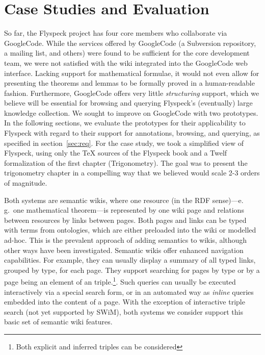 \section{Case Studies and Evaluation}

So far, the Flyspeck project has four core members who collaborate via
GoogleCode\cite{website:FlyspeckProjectPage}.  While the services offered by
GoogleCode (a Subversion repository, a mailing list, and others) were
found to be sufficient for the core development team, we were not
satisfied with the wiki integrated into the GoogleCode web interface.
Lacking support for mathematical formulae, it would not even allow for
presenting the theorems and lemmas to be formally proved in a
human-readable fashion.  Furthermore, GoogleCode offers very
little \emph{structuring} support, which we believe will be
essential for browsing and querying Flyspeck's 
(eventually) large knowledge collection.  We sought to improve
on GoogleCode with two prototypes.  
In the following sections, we evaluate the prototypes 
for their applicability to Flyspeck with regard to their
support for annotations, browsing, and querying, as specified in
section~\ref{sec:req}.  For the case study, we took a simplified 
view of Flyspeck, using only the {\TeX} sources of the
Flyspeck book and a Twelf formalization of the first chapter (Trigonometry).
The goal was to present the trigonometry chapter in a compelling way
that we believed would scale 2-3 orders of magnitude.  

Both systems are semantic wikis, where one resource (in the RDF
sense)---e.\,g.\ one mathematical theorem---is represented by one wiki
page and relations between resources by links between pages.  Both
pages and links can be typed with terms from
ontologies\cite{OrDeMoVoHa06:annotation-navigation-semwiki}, which are
either preloaded into the wiki or modelled
ad-hoc\cite{KrSchVr:semwiki-reasoning07}.  This is the prevalent
approach of adding semantics to wikis, although other ways have been
investigated\cite{semwiki06}.  Semantic wikis offer enhanced
navigation capabilities.   For example, they can usually display
a summary of all typed links, grouped by type, for each page.  They support
searching for pages by type or by a page being an element of an
triple.\footnote{Both explicit and inferred triples can be considered\cite{KrSchVr:semwiki-reasoning07}}.  Such queries can
usually be executed interactively via a special search form, or in an
automated way as \emph{inline} queries 
embedded into the content of a
page.  With the exception of interactive triple search (not yet
supported by SWiM), both systems we consider support this basic set of semantic
wiki features.

